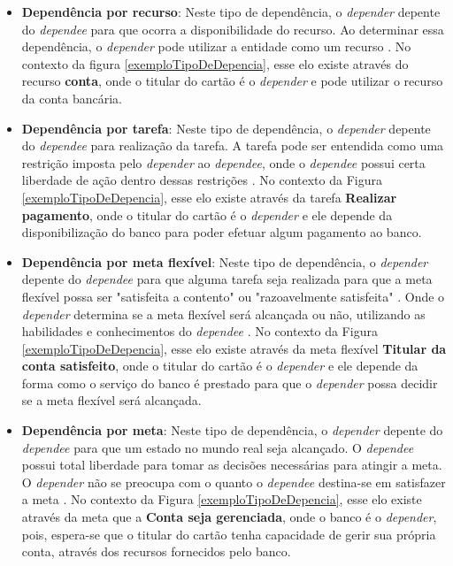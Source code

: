 \begin{itemize}
	\item \textbf{Dependência por recurso}: Neste tipo de dependência, o \textit{depender} depente do \textit{dependee} para que ocorra a disponibilidade do recurso. Ao determinar essa dependência, o \textit{depender} pode utilizar a entidade como um recurso \cite{istarwiki20}. No contexto da figura \ref{exemploTipoDeDepencia}, esse elo existe através do recurso \textbf{conta}, onde o titular do cartão é o \textit{depender} e pode utilizar o recurso da conta bancária.
	
	\item \textbf{Dependência por tarefa}: Neste tipo de dependência, o \textit{depender} depente do \textit{dependee} para realização da tarefa. A tarefa pode ser entendida como uma restrição imposta pelo \textit{depender} ao \textit{dependee}, onde o \textit{dependee} possui certa liberdade de ação dentro dessas restrições \cite{istarwiki20}. No contexto da Figura \ref{exemploTipoDeDepencia}, esse elo existe através da tarefa \textbf{Realizar pagamento}, onde o titular do cartão é o \textit{depender} e ele depende da disponibilização do banco para poder efetuar algum pagamento ao banco. 
	
	\item \textbf{Dependência por meta flexível}: Neste tipo de dependência, o \textit{depender} depente do \textit{dependee} para que alguma tarefa seja realizada para que a meta flexível possa ser "satisfeita a contento" ou "razoavelmente satisfeita" \cite{istarwiki20}. Onde o \textit{depender} determina se a meta flexível será alcançada ou não, utilizando as habilidades e conhecimentos do \textit{dependee} \cite{napolitano2009estrategia}. No contexto da Figura \ref{exemploTipoDeDepencia}, esse elo existe através da meta flexível \textbf{Titular da conta satisfeito}, onde o titular do cartão é o \textit{depender} e ele depende da forma como o serviço do banco é prestado para que o \textit{depender} possa decidir se a meta flexível será alcançada.
	
	\item \textbf{Dependência por meta}: Neste tipo de dependência, o \textit{depender} depente do \textit{dependee} para que um estado no mundo real seja alcançado. O \textit{dependee} possui total liberdade para tomar as decisões necessárias para atingir a meta. O \textit{depender} não se preocupa com o quanto o \textit{dependee} destina-se em satisfazer a meta \cite{istarwiki20}. No contexto da Figura \ref{exemploTipoDeDepencia}, esse elo existe através da meta que a \textbf{Conta seja gerenciada}, onde o banco é o \textit{depender}, pois, espera-se que o titular do cartão tenha capacidade de gerir sua própria conta, através dos recursos fornecidos pelo banco. 
\end{itemize}

